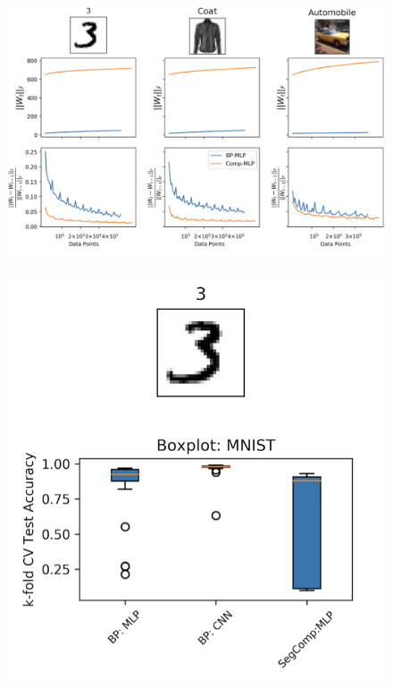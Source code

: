 \documentclass[dvipsnames, usenames]{beamer}
\begin{document}
\begin{frame}[noframenumbering]
	\begin{figure}
		\centering
		\includegraphics[width=\textwidth]{../figures/report/p2_2}
	\end{figure}
\end{frame}



\begin{frame}
	\begin{figure}
		\centering
		\includegraphics[height=1\textheight]{../figures/report/p3_1}
	\end{figure}
\end{frame}
\end{document}
